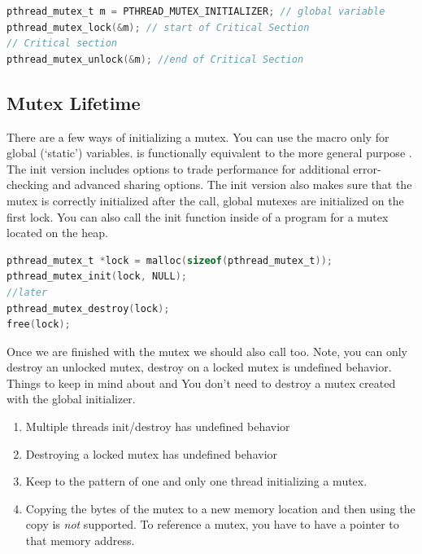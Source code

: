 \begin{lstlisting}[language=C]
pthread_mutex_t m = PTHREAD_MUTEX_INITIALIZER; // global variable
pthread_mutex_lock(&m); // start of Critical Section
// Critical section
pthread_mutex_unlock(&m); //end of Critical Section
\end{lstlisting}

\subsection{Mutex Lifetime}

There are a few ways of initializing a mutex.
You can use the macro  only for global (`static') variables.
 is functionally equivalent to the more general purpose .
The init version includes options to trade performance for additional error-checking and advanced sharing options.
The init version also makes sure that the mutex is correctly initialized after the call, global mutexes are initialized on the first lock.
You can also call the init function inside of a program for a mutex located on the heap.

\begin{lstlisting}[language=C]
pthread_mutex_t *lock = malloc(sizeof(pthread_mutex_t));
pthread_mutex_init(lock, NULL);
//later
pthread_mutex_destroy(lock);
free(lock);
\end{lstlisting}

Once we are finished with the mutex we should also call  too.
Note, you can only destroy an unlocked mutex, destroy on a locked mutex is undefined behavior.
Things to keep in mind about  and 
You don't need to destroy a mutex created with the global initializer.

\begin{enumerate}
\item Multiple threads init/destroy has undefined behavior
\item Destroying a locked mutex has undefined behavior
\item Keep to the pattern of one and only one thread initializing a mutex.
\item Copying the bytes of the mutex to a new memory location and then using the copy is \emph{not} supported.
  To reference a mutex, you have to have a pointer to that memory address.
\end{enumerate}

